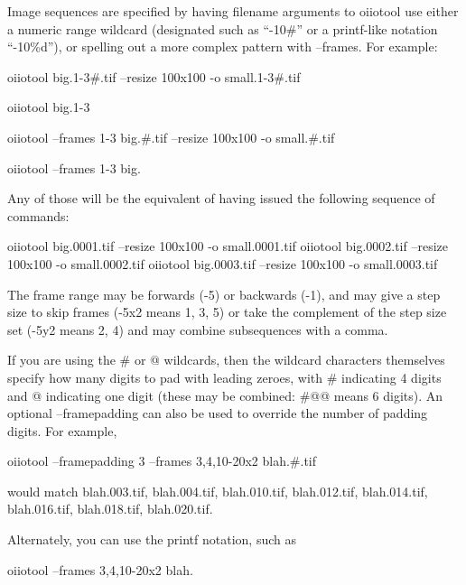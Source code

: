 Image sequences are specified by having filename arguments to
oiiotool use either a numeric range wildcard (designated such as
``{-10\#}'' or a {\cf printf}-like notation ``{-10\%d}''),
or spelling out a more complex pattern with
{\cf --frames}.  For example:

\begin{code}
    oiiotool big.1-3#.tif --resize 100x100 -o small.1-3#.tif

    oiiotool big.1-3%

    oiiotool --frames 1-3 big.#.tif --resize 100x100 -o small.#.tif

    oiiotool --frames 1-3 big.%
\end{code}

\noindent Any of those will be the equivalent of having issued the following
sequence of commands:

\begin{code}
    oiiotool big.0001.tif --resize 100x100 -o small.0001.tif
    oiiotool big.0002.tif --resize 100x100 -o small.0002.tif
    oiiotool big.0003.tif --resize 100x100 -o small.0003.tif
\end{code}

The frame range may be forwards ({-5}) or backwards ({-1}),
and may give a step size to skip frames ({-5x2} means 1, 3, 5) or
take the complement of the step size set ({-5y2} means 2, 4) and
may combine subsequences with a comma.

If you are using the {\cf \#} or {\cf @} wildcards, then
the wildcard characters themselves specify how many digits to pad
with leading zeroes, with {\cf \#} indicating 4 digits and {\cf @}
indicating one digit (these may be combined: {\cf \#@@} means 6 digits).
An optional {\cf --framepadding} can also be used to override the number
of padding digits.
For example,
\begin{code}
    oiiotool --framepadding 3 --frames 3,4,10-20x2 blah.#.tif
\end{code}
\noindent would match {\cf blah.003.tif}, {\cf blah.004.tif},
{\cf blah.010.tif}, {\cf blah.012.tif}, 
{\cf blah.014.tif}, {\cf blah.016.tif}, {\cf blah.018.tif}, 
{\cf blah.020.tif}.

Alternately, you can use the {\cf printf} notation, such as
\begin{code}
    oiiotool --frames 3,4,10-20x2 blah.%
\end{code}

